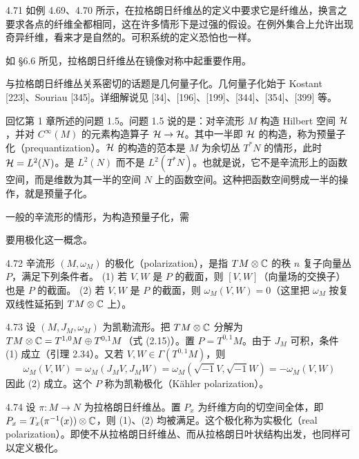\begin{remark}{4.71}
  如例 4.69、4.70 所示，在拉格朗日纤维丛的定义中要求它是纤维丛，换言之要求各点的纤维全都相同，这在许多情形下是过强的假设。在例外集合上允许出现奇异纤维，看来才是自然的。可积系统的定义恐怕也一样。
\end{remark}

如 §6.6 所见，拉格朗日纤维丛在镜像对称中起重要作用。

与拉格朗日纤维丛关系密切的话题是几何量子化。几何量子化始于 Kostant [223]、Souriau [345]。详细解说见 [34]、[196]、[199]、[344]、[354]、[399] 等。

回忆第 1 章所述的问题 1.5。问题 1.5 说的是：对辛流形 $M$ 构造 Hilbert 空间 $\mathcal{H}$，并对 $C^\infty(M)$ 的元素构造算子 $\mathcal{H}\to\mathcal{H}$。其中一半即 $\mathcal{H}$ 的构造，称为预量子化（prequantization）。$\mathcal{H}$ 的构造的范本是 $M$ 为余切丛 $T^*N$ 的情形，此时 $\mathcal{H}=L^2(N)$。是 $L^2(N)$ 而不是 $L^2(T^*N)$。也就是说，它不是辛流形上的函数空间，而是维数为其一半的空间 $N$ 上的函数空间。这种把函数空间劈成一半的操作，就是预量子化。

一般的辛流形的情形，为构造预量子化，需

要用极化这一概念。

\begin{definition}{4.72}
  辛流形 $(M,\omega_M)$ 的极化（polarization），是指 $TM\otimes\mathbb{C}$ 的秩 $n$ 复子向量丛 $P$，满足下列条件者。
  (1) 若 $V,W$ 是 $P$ 的截面，则 $[V,W]$（向量场的交换子）也是 $P$ 的截面。
  (2) 若 $V,W$ 是 $P$ 的截面，则 $\omega_M(V,W)=0$（这里把 $\omega_M$ 按复双线性延拓到 $TM\otimes\mathbb{C}$ 上）。
\end{definition}

\begin{example}{4.73}
  设 $(M,J_M,\omega_M)$ 为凯勒流形。把 $TM\otimes\mathbb{C}$ 分解为 $TM\otimes\mathbb{C}=T^{1,0}M\oplus T^{0,1}M$（式 (2.15)）。置 $P=T^{0,1}M$。由于 $J_M$ 可积，条件 (1) 成立（引理 2.34）。又若 $V,W\in\Gamma(T^{0,1}M)$，则
  \[
    \omega_M(V,W)=\omega_M(J_MV,J_MW)=\omega_M(\sqrt{-1}V,\sqrt{-1}W)=-\omega_M(V,W)
  \]
  因此 (2) 成立。这个 $P$ 称为凯勒极化（Kähler polarization）。
\end{example}

\begin{example}{4.74}
  设 $\pi:M\to N$ 为拉格朗日纤维丛。置 $P_x$ 为纤维方向的切空间全体，即 $P_x=T_x(\pi^{-1}(x))\otimes\mathbb{C}$，则 (1)、(2) 均被满足。这个极化称为实极化（real polarization）。即使不从拉格朗日纤维丛、而从拉格朗日叶状结构出发，也同样可以定义极化。
\end{example}

